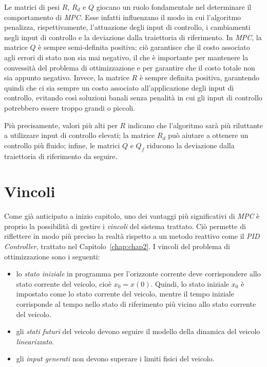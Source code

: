 Le matrici di pesi $R$, $R_d$ e $Q$ giocano un ruolo fondamentale nel determinare il comportamento
di \textit{MPC}. Esse infatti influenzano il modo in cui l'algoritmo penalizza, rispettivamente, l'attuazione 
degli input di controllo, i cambiamenti negli input di controllo e la deviazione dalla traiettoria di riferimento.
In \textit{MPC}, la matrice $Q$ è sempre semi-definita positiva; ciò garantisce che il costo 
associato agli errori di stato non sia mai negativo, il che è importante per mantenere la 
convessità del problema di ottimizzazione e per garantire che il costo totale non sia appunto negativo.
Invece, la matrice $R$ è sempre definita positiva, garantendo quindi che ci sia sempre un costo associato 
all'applicazione degli input di controllo, evitando così soluzioni banali senza penalità in cui gli input
di controllo potrebbero essere troppo grandi o piccoli. 

Più precisamente, valori più alti per $R$ indicano che l'algoritmo sarà più riluttante a 
utilizzare input di controllo elevati; la matrice $R_d$ può aiutare a ottenere un controllo più 
fluido; infine, le matrici $Q$ e $Q_f$ riducono la deviazione dalla traiettoria di riferimento da seguire.
\section{Vincoli}
Come già anticipato a inizio capitolo, uno dei vantaggi più significativi di \textit{MPC} è 
proprio la possibilità di gestire i \textit{vincoli} del sistema trattato. 
Ciò permette di riflettere in modo più preciso la realtà rispetto a un metodo reattivo come
il \textit{PID Controller}, trattato nel Capitolo~\ref{chap:chap2}.
I vincoli del problema di ottimizzazione sono i seguenti:
\begin{itemize}
    \item lo \textit{stato iniziale} in programma per l'orizzonte corrente deve corrispondere allo 
    stato corrente del veicolo, cioè $x_0 = x(0)$. Quindi, lo stato iniziale $x_0$ è 
    impostato come lo stato corrente del veicolo, mentre il tempo iniziale corrisponde al tempo 
    nello stato di riferimento più vicino allo stato corrente del veicolo.
    \item gli \textit{stati futuri} del veicolo devono seguire il modello della dinamica del veicolo \textit{linearizzato}.
    \item gli \textit{input generati} non devono superare i limiti fisici del veicolo.
\end{itemize}

